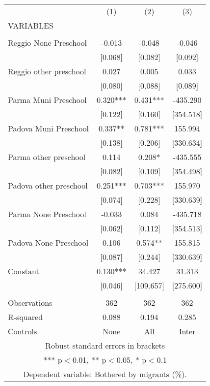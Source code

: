 \begin{tabular}{lccc} \hline
 & (1) & (2) & (3) \\
VARIABLES &  &  &  \\ \hline
 &  &  &  \\
Reggio None Preschool & -0.013 & -0.048 & -0.046 \\
 & [0.068] & [0.082] & [0.092] \\
Reggio other preschool & 0.027 & 0.005 & 0.033 \\
 & [0.080] & [0.088] & [0.089] \\
Parma Muni Preschool & 0.320*** & 0.431*** & -435.290 \\
 & [0.122] & [0.160] & [354.518] \\
Padova Muni Preschool & 0.337** & 0.781*** & 155.994 \\
 & [0.138] & [0.206] & [330.634] \\
Parma other preschool & 0.114 & 0.208* & -435.555 \\
 & [0.082] & [0.109] & [354.498] \\
Padova other preschool & 0.251*** & 0.703*** & 155.970 \\
 & [0.074] & [0.228] & [330.639] \\
Parma None Preschool & -0.033 & 0.084 & -435.718 \\
 & [0.062] & [0.112] & [354.513] \\
Padova None Preschool & 0.106 & 0.574** & 155.815 \\
 & [0.087] & [0.244] & [330.639] \\
Constant & 0.130*** & 34.427 & 31.313 \\
 & [0.046] & [109.657] & [275.600] \\
 &  &  &  \\
Observations & 362 & 362 & 362 \\
R-squared & 0.088 & 0.194 & 0.285 \\
 Controls & None & All & Inter \\ \hline
\multicolumn{4}{c}{ Robust standard errors in brackets} \\
\multicolumn{4}{c}{ *** p$<$0.01, ** p$<$0.05, * p$<$0.1} \\
\multicolumn{4}{c}{ Dependent variable: Bothered by migrants (\%).} \\
\end{tabular}
